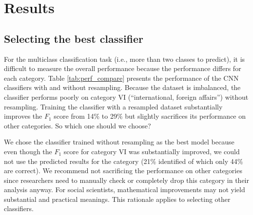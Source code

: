 \documentclass[11pt]{article}
\begin{document}
\section{Results}


\subsection{Selecting the best classifier}

For the multiclass classification task (i.e., more than two classes to predict), it is difficult to measure the overall performance because the performance differs for each category. Table \ref{tab:perf_compare} presents the performance of the CNN classifiers with and without resampling. Because the dataset is imbalanced, the classifier performs poorly on category VI (``international, foreign affairs'') without resampling. Training the classifier with a resampled dataset substantially improves the $F_1$ score from 14\% to 29\% but slightly sacrifices its performance on other categories. So which one should we choose?

We chose the classifier trained without resampling as the best model because even though the $F_1$ score for category VI was substantially improved, we could not use the predicted results for the category (21\% identified of which only 44\% are correct). We recommend not sacrificing the performance on other categories since researchers need to manually check or completely drop this category in their analysis anyway. For social scientists, mathematical improvements may not yield substantial and practical meanings. This rationale applies to selecting other classifiers.
\end{document}
